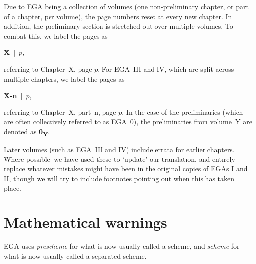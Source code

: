 Due to EGA being a collection of volumes (one non-preliminary chapter, or part of a chapter, per volume), the page numbers reset at every new chapter.
In addition, the preliminary section is stretched out over multiple volumes.
To combat this, we label the pages as
\begin{center}
  \textbf{X}~|~$p$,
\end{center}
referring to Chapter~X, page $p$.
For EGA~III and IV, which are split across multiple chapters, we label the pages as
\begin{center}
  \textbf{X-n}~|~$p$,
\end{center}
referring to Chapter~X, part~n, page $p$.
In the case of the preliminaries (which are often collectively referred to as EGA~0), the preliminaries from volume~Y are denoted as \textbf{0\textsubscript{Y}}.

\sectionbreak

Later volumes (such as EGA~III and IV) include errata for earlier chapters.
Where possible, we have used these to `update' our translation, and entirely replace whatever mistakes might have been in the original copies of EGAs I and II, though we will try to include footnotes pointing out when this has taken place.

\section*{\textbf{Mathematical warnings}}
EGA uses \emph{prescheme} for what is now usually called a scheme, and \emph{scheme} for what is now usually called a separated scheme.



